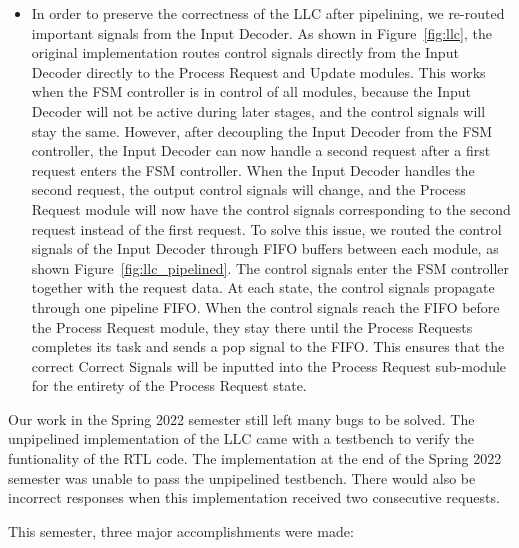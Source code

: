 \documentclass{sig-alternate}
\begin{document}
\begin{itemize}
  \item In order to preserve the correctness of the LLC after pipelining, we re-routed important signals from the Input Decoder. As shown in Figure~\ref{fig:llc}, the original implementation 
  routes control signals directly from the Input Decoder directly to the Process Request and Update modules. This works when the FSM controller is in control of all modules, because 
  the Input Decoder will not be active during later stages, and the control signals will stay the same. However, after decoupling the Input Decoder from the FSM controller, the Input Decoder can now handle a second request after 
  a first request enters the FSM controller. When the Input Decoder handles the second request, the output control signals will change, and the Process Request module will now have the control signals corresponding to the second request instead of the first request.
  To solve this issue, we routed the control signals of the Input Decoder through FIFO buffers between each module, as shown Figure~\ref{fig:llc_pipelined}. The control signals enter the FSM controller together with the request data. At each state, the control signals propagate through one pipeline FIFO. 
  When the control signals reach the FIFO before the Process Request module, they stay there until the Process Requests completes its task and sends a pop signal to the FIFO. This ensures that the correct Correct Signals will be inputted into the Process Request sub-module for the entirety of the Process Request state. 
\end{itemize}
\par Our work in the Spring 2022 semester still left many bugs to be solved. The unpipelined implementation of the LLC came with a testbench to verify the funtionality of the RTL code. The implementation at the end
 of the Spring 2022 semester was unable to pass the unpipelined testbench. There would also be incorrect responses when this implementation received two consecutive requests.
\par This semester, three major accomplishments were made:
\end{document}
